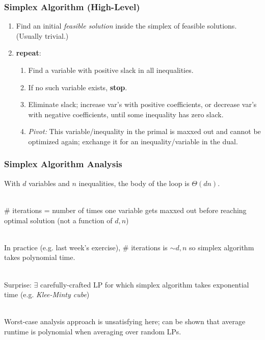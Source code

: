 \documentclass{beamer}
\newcommand{\stanza}{ \\~\ }
\begin{document}
\begin{frame} \frametitle{Simplex Algorithm (High-Level)}
\begin{enumerate}
  \item Find an initial \emph{feasible solution} inside the simplex of feasible solutions.
    (Usually trivial.)
  \item \textbf{repeat}:
    \begin{enumerate}
      \item Find a variable with positive slack in all inequalities.
      \item If no such variable exists, \textbf{stop}.
      \item Eliminate slack; increase var's with positive coefficients, or decrease
        var's with negative coefficients, until some inequality has zero slack.
      \item \emph{Pivot:} This variable/inequality in the primal is maxxed out and
        cannot be optimized again; exchange it for an inequality/variable in the dual.
      \end{enumerate}
\end{enumerate}
\end{frame}

\begin{frame} \frametitle{Simplex Algorithm Analysis}
With $d$ variables and $n$ inequalities, the body of the loop is $\Theta(dn).$ \stanza

\# iterations = number of times one variable gets maxxed out before reaching optimal solution
(not a function of $d, n$) \stanza

In practice (e.g. last week's exercise), \# iterations is $\sim d, n$ so simplex algorithm
takes polynomial time. \stanza

Surprise: $\exists$ carefully-crafted LP for which simplex algorithm takes exponential
time (e.g. \emph{Klee-Minty cube}) \stanza

Worst-case analysis approach is unsatisfying here; can be shown that average runtime
is polynomial when averaging over random LPs.
\end{frame}
\end{document}
